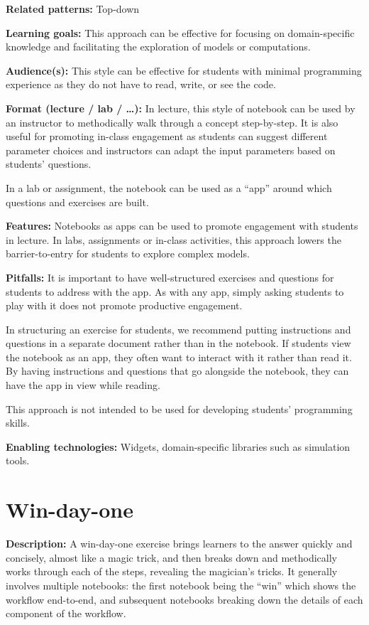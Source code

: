 \documentclass[]{book}
\begin{document}
\textbf{Related patterns:} Top-down

\textbf{Learning goals:} This approach can be effective for focusing on
domain-specific knowledge and facilitating the exploration of models or
computations.

\textbf{Audience(s):} This style can be effective for students with
minimal programming experience as they do not have to read, write, or
see the code.

\textbf{Format (lecture / lab / \ldots{}):} In lecture, this style of
notebook can be used by an instructor to methodically walk through a
concept step-by-step. It is also useful for promoting in-class
engagement as students can suggest different parameter choices and
instructors can adapt the input parameters based on students' questions.

In a lab or assignment, the notebook can be used as a ``app'' around
which questions and exercises are built.

\textbf{Features:} Notebooks as apps can be used to promote engagement
with students in lecture. In labs, assignments or in-class activities,
this approach lowers the barrier-to-entry for students to explore
complex models.

\textbf{Pitfalls:} It is important to have well-structured exercises and
questions for students to address with the app. As with any app, simply
asking students to play with it does not promote productive engagement.

In structuring an exercise for students, we recommend putting
instructions and questions in a separate document rather than in the
notebook. If students view the notebook as an app, they often want to
interact with it rather than read it. By having instructions and
questions that go alongside the notebook, they can have the app in view
while reading.

This approach is not intended to be used for developing students'
programming skills.

\textbf{Enabling technologies:} Widgets, domain-specific libraries such
as simulation tools.

\hypertarget{win-day-one}{\section{Win-day-one}\label{win-day-one}}

\textbf{Description:} A win-day-one exercise brings learners to the
answer quickly and concisely, almost like a magic trick, and then breaks
down and methodically works through each of the steps, revealing the
magician's tricks. It generally involves multiple notebooks: the first
notebook being the ``win'' which shows the workflow end-to-end, and
subsequent notebooks breaking down the details of each component of the
workflow.
\end{document}
